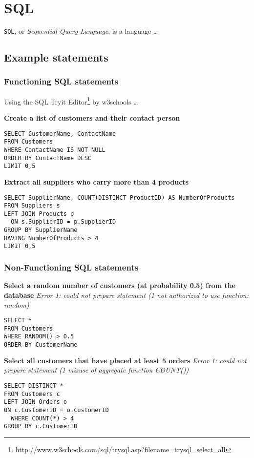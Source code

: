 %

\section{SQL}
\texttt{SQL}, or \textit{Sequential Query Language}, is a language \dots

\subsection{Example statements}

\subsubsection{Functioning SQL statements}
Using the SQL Tryit Editor\footnote{http://www.w3schools.com/sql/trysql.asp?filename=trysql\_select\_all}
by w3schools \dots

\textbf{Create a list of customers and their contact person}
\begin{lstlisting}
SELECT CustomerName, ContactName
FROM Customers
WHERE ContactName IS NOT NULL
ORDER BY ContactName DESC
LIMIT 0,5
\end{lstlisting}

\textbf{Extract all suppliers who carry more than 4 products}
\begin{lstlisting}
SELECT SupplierName, COUNT(DISTINCT ProductID) AS NumberOfProducts
FROM Suppliers s
LEFT JOIN Products p
  ON s.SupplierID = p.SupplierID
GROUP BY SupplierName
HAVING NumberOfProducts > 4
LIMIT 0,5
\end{lstlisting}


\subsubsection{Non-Functioning SQL statements}
\textbf{Select a random number of customers (at probability 0.5) from the
  database}
\textit{Error 1: could not prepare statement (1 not authorized to use function: random)}
\begin{lstlisting}
SELECT *
FROM Customers
WHERE RANDOM() > 0.5
ORDER BY CustomerName
\end{lstlisting}

\textbf{Select all customers that have placed at least 5 orders}
\textit{Error 1: could not prepare statement (1 misuse of aggregate function COUNT())}
\begin{lstlisting}
SELECT DISTINCT *
FROM Customers c
LEFT JOIN Orders o
ON c.CustomerID = o.CustomerID
  WHERE COUNT(*) > 4
GROUP BY c.CustomerID 
\end{lstlisting}
